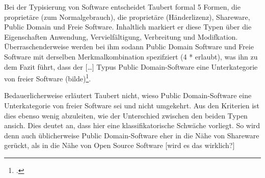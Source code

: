\documentclass[DIV=calc,BCOR=5mm,11pt,headings=small,oneside,abstract=true, toc=bib]{scrartcl}
\begin{document}
Bei der Typisierung von Software entscheidet Taubert formal 5 Formen, die
\glqq{}proprietäre (zum Normalgebrauch)\grqq{}, die
\glqq{}proprietäre (Händerlizenz)\grqq{}, \glqq{}Shareware\grqq{}, \glqq{}Public
Domain\grqq{} und \glqq{}Freie Software\grqq{}. Inhaltlich markiert er diese
Typen über die Eigenschaften \glqq{}Anwendung\grqq{},
\glqq{}Vervielfältigung\grqq{}, \glqq{}Verbreitung\grqq{} und
\glqq{}Modifkation\grqq{}. Überraschenderweise werden bei ihm sodann Public
Domain Software und Freie Software mit derselben Merkmalkombination spezifziert
(4 * erlaubt), was ihn zu dem Fazit führt, dass der \glqq{}[\ldots] Typus Public
Domain-Software eine Unterkategorie von freier Software
(bilde)\grqq\footcite[cf.][25]{Taubert2006a}.

Bedauerlicherweise erläutert Taubert nicht, wieso Public Domain-Software eine
Unterkategorie von freier Software sei und nicht umgekehrt. Aus den Kriterien
ist dies ebenso wenig abzuleiten, wie der Unterschied zwischen den beiden
Typen ansich. Dies deutet an, dass hier eine klassifikatorische Schwäche
vorliegt. So wird denn auch üblicherweise Public Domain-Software eher in die
Nähe von Shareware gerückt, als in die Nähe von Open Source Software [wird es
das wirklich?]

\small

\end{document}
